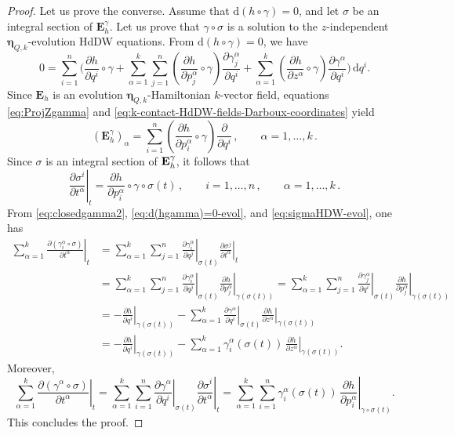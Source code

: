 \documentclass[11pt,twoside]{article}
\theoremstyle{plain}
\theoremstyle{definition}
\theoremstyle{remark}
\newcommand{\dd}{\mathrm{d}}
\newcommand\restr[2]{\left.#1\right|_{#2}} \newcommand{\bfX}{\mathbf{X}} \newcommand{\bfY}{\mathbf{Y}} \newcommand{\bfZ}{\mathbf{Z}} \newcommand{\qeddiamond}{\hfill $\diamond$} \newcommand{\parder}[2]{\frac{\partial #1}{\partial #2}} \newcommand{\dparder}[2]{\dfrac{\partial #1}{\partial #2}} \newcommand{\tparder}[2]{\partial #1/\partial #2} \newcommand{\parderr}[3]{\frac{\partial^2 #1}{\partial #2\partial #3}} \newcommand{\dparderr}[3]{\dfrac{\partial^2 #1}{\partial #2\partial #3}} \newcommand{\tparderr}[3]{\partial^2 #1/\partial #2\partial #3}
\begin{document}
\begin{proof}
Let us prove the converse. Assume that $\dd (h \circ \gamma) = 0$, and let $\sigma$ be an integral section of $\mathbf E_h^\gamma$. Let us prove that $\gamma \circ \sigma$ is a solution to the $z$-independent ${\bm \eta}_{Q,k}$-evolution HdDW equations. From $\dd(h\circ \gamma)=0$, we have
\begin{equation}
\label{eq:d(hgamma)=0-evol}
0
=
\sum_{i=1}^n
\Bigg(
  \frac{\partial h}{\partial q^i} \circ \gamma
  + \sum_{\alpha=1}^k \sum_{j=1}^n
    \left(\frac{\partial h}{\partial p^\alpha_j} \circ \gamma \right)
    \frac{\partial \gamma^\alpha_j}{\partial q^i}
  + \sum_{\alpha=1}^k
    \left(\frac{\partial h}{\partial z^\alpha} \circ \gamma \right)
    \frac{\partial \gamma^\alpha}{\partial q^i}
\Bigg)
\, \dd q^i.
\end{equation}
Since $\mathbf E_h$ is an evolution ${\bm \eta}_{Q,k}$-Hamiltonian $k$-vector field, equations \eqref{eq:ProjZgamma} and \eqref{eq:k-contact-HdDW-fields-Darboux-coordinates} yield
\[
(\mathbf E_h^\gamma)_\alpha
=
\sum_{i=1}^n
\left(
  \frac{\partial h}{\partial p_i^\alpha}
  \circ \gamma
\right)
\frac{\partial}{\partial q^i}\,,
\qquad \alpha=1,\dotsc,k\,.
\]
Since $\sigma$ is an integral section of ${\bf E}_h^\gamma$, it follows that
\begin{equation}
\label{eq:sigmaHDW-evol}
\restr{\frac{\partial \sigma^i}{\partial t^\alpha}}{t} = \frac{\partial h}{\partial p_i^\alpha}\circ \gamma \circ \sigma(t)\,,\qquad i=1,\dotsc,n\,,\qquad \alpha=1,\dotsc,k\,.
\end{equation}
From \eqref{eq:closedgamma2}, \eqref{eq:d(hgamma)=0-evol}, and \eqref{eq:sigmaHDW-evol}, one has
\begin{align}
\sum_{\alpha=1}^k
\restr{\frac{\partial(\gamma_i^\alpha \circ \sigma)}{\partial t^\alpha}}{t}
&=
\sum_{\alpha=1}^k \sum_{j=1}^n
\restr{\frac{\partial \gamma_i^\alpha}{\partial q^j}}{\sigma(t)}
\restr{\frac{\partial \sigma^j}{\partial t^\alpha}}{t}
\\
&=
\sum_{\alpha=1}^k \sum_{j=1}^n
\restr{\frac{\partial \gamma_i^\alpha}{\partial q^j}}{\sigma(t)}
\restr{\frac{\partial h}{\partial p_j^\alpha}}{\gamma(\sigma(t))}
=
\sum_{\alpha=1}^k \sum_{j=1}^n
\restr{\frac{\partial \gamma_j^\alpha}{\partial q^i}}{\sigma(t)}
\restr{\frac{\partial h}{\partial p_j^\alpha}}{\gamma(\sigma(t))}
\\
&=
- \restr{\frac{\partial h}{\partial q^i}}{\gamma(\sigma(t))}
-
\sum_{\alpha=1}^k
\restr{\frac{\partial \gamma^\alpha}{\partial q^i}}{\sigma(t)}
\restr{\frac{\partial h}{\partial z^\alpha}}{\gamma(\sigma(t))}
\\
&=
- \restr{\frac{\partial h}{\partial q^i}}{\gamma(\sigma(t))}
-
\sum_{\alpha=1}^k
\gamma_i^\alpha (\sigma(t))\,
\restr{\frac{\partial h}{\partial z^\alpha}}{\gamma(\sigma(t))}.
\end{align}
Moreover,
\[
\sum_{\alpha=1}^k
\restr{\frac{\partial (\gamma^\alpha \circ \sigma)}{\partial t^\alpha}}{t}
=
\sum_{\alpha=1}^k \sum_{i=1}^n
\restr{\frac{\partial \gamma^\alpha}{\partial q^i}}{\sigma(t)}
\restr{\frac{\partial \sigma^i}{\partial t^\alpha}}{t}
=
\sum_{\alpha=1}^k \sum_{i=1}^n
\gamma^\alpha_i(\sigma(t))\,
\restr{\frac{\partial h}{\partial p_i^\alpha}}{\gamma\circ\sigma(t)}.
\]
This concludes the proof.
\end{proof}
\end{document}
